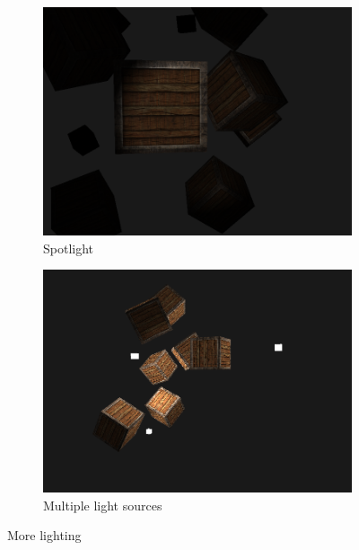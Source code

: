 \documentclass[12pt]{article}
\begin{document}
    \begin{figure}[H]
        \centering
        \begin{subfigure}[b]{0.45\textwidth}
            \centering
            \includegraphics[width=\textwidth]{spotLight.png}
            \caption{Spotlight}
        \end{subfigure}
        \hfill
        \begin{subfigure}[b]{0.45\textwidth}
            \centering
            \includegraphics[width=\textwidth]{multipleLightsAndSpotlight.png}
            \caption{Multiple light sources}
        \end{subfigure}
        \caption{More lighting}
    \end{figure}
\end{document}
